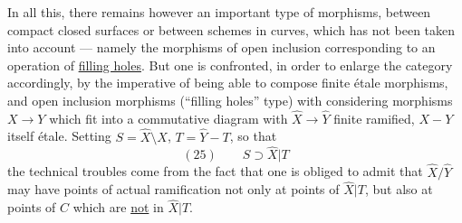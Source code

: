 In all this, there remains however an
important type of  morphisms, between
compact closed  surfaces or between schemes in
curves, which has not been taken into
account --- namely the morphisms
of open inclusion
corresponding to an operation of \uline{filling
holes}. But one is confronted, in order to enlarge the
category accordingly, by the imperative of
being able to compose finite étale morphisms,
and open inclusion morphisms (``filling holes'' type)
with considering morphisms $X\longrightarrow Y$ which
fit into a commutative diagram
with $\widehat X\longrightarrow\widehat Y$ finite ramified, $X\mathbin{-}Y$ itself étale.
Setting $S=\widehat X\setminus X$, $T=\widehat Y-T$, so that
\[
(25)\qquad S\supset\widehat X|T
\]
the technical troubles come from the fact that
one is obliged to admit that $\widehat X/\widehat Y$ may have
points of actual ramification not only at
points of $\widehat X|T$, but also at points of $C$ which
are \uline{not} in $\widehat X|T$.
